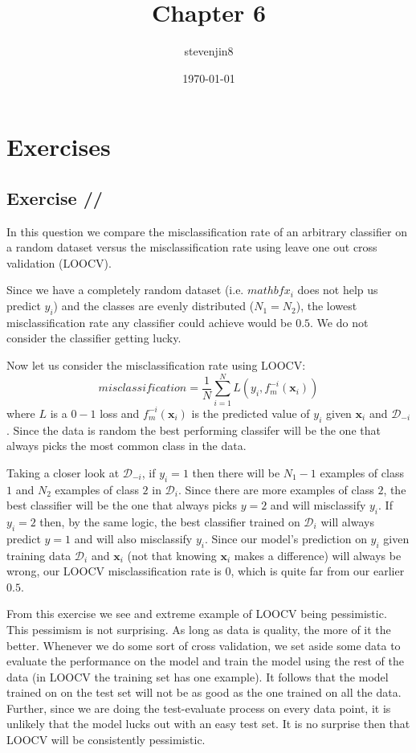 \documentclass[a4paper,11pt]{article}
\title{Chapter 6}
\author{stevenjin8}
\date{\today}
\newcounter{exercise}
\newcounter{subexercise}
\newcommand*{\exercise}[1][]{\subsection*{Exercise \ifx/#1/\stepcounter{exercise}\arabic{exercise}\else#1\fi}\setcounter{subexercise}{0}}
\begin{document}
\maketitle
\section*{Exercises}
\exercise
In this question we compare the misclassification rate of an arbitrary classifier
on a random dataset versus the misclassification rate using leave one out cross
validation (LOOCV).

Since we have a completely random dataset (i.e. $mathbf{x}_i$ does not help
us predict $y_i$) and the classes are evenly distributed ($N_1 = N_2$),
the lowest misclassification rate any classifier could achieve would be
$0.5$. We do not consider the classifier getting lucky.

Now let us consider the misclassification rate using LOOCV:
\begin{equation}
    misclassification = \frac{1}{N}\sum\limits_{i=1}^{N}
    L(y_i, f_m^{-i}(\mathbf{x}_i))
\end{equation}
where $L$ is a $0-1$ loss and $f_m^{-i}(\mathbf{x}_i)$ is the predicted value
of $y_i$ given $\mathbf{x}_i$ and $\mathcal{D}_{-i}$. Since the data is random
the best performing classifer will be the one that always picks the most common
class in the data.

Taking a closer look at $\mathcal{D}_{-i}$, if $y_i=1$ then there will be
$N_1-1$ examples of class $1$ and $N_2$ examples of class $2$ in $\mathcal{D}_i$. Since there
are more examples of class $2$, the best classifier will be the one that always
picks $y=2$ and will misclassify $y_i$. If $y_i=2$ then, by the same logic,
the best classifier trained on
$\mathcal{D}_i$ will always predict $y=1$ and will also misclassify $y_i$.
Since our model's prediction on $y_i$ given training data $\mathcal{D}_i$ and
$\mathbf{x}_i$ (not that knowing $\mathbf{x}_i$ makes a difference) will always be 
wrong, our LOOCV misclassification rate is 0, which is quite far from our 
earlier $0.5$.

From this exercise we see and extreme example of LOOCV being pessimistic. This
pessimism is not surprising. As long as data is quality, the more of it the
better. Whenever we do some sort of cross validation, we set aside some
data to evaluate the performance on the model and train the model using the rest
of the data (in LOOCV the training set has one example).
It follows that the model trained on on the test
set will not be as good as the one trained on all the data. Further, since we are
doing the test-evaluate process on every data point, it is unlikely that the model
lucks out with an easy test set. It is no surprise then that LOOCV will be
consistently pessimistic.
\end{document}
